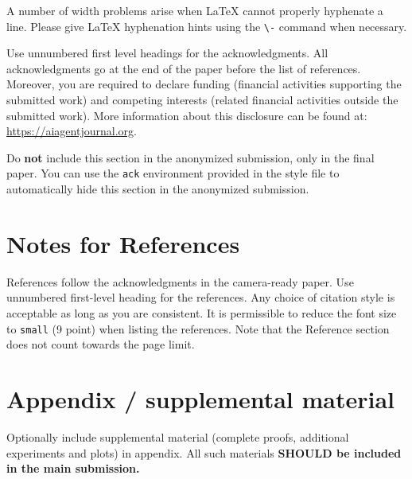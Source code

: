 \documentclass{article}
\begin{document}
A number of width problems arise when \LaTeX{} cannot properly hyphenate a
line. Please give LaTeX hyphenation hints using the \verb+\-+ command when
necessary.

\begin{ack}
Use unnumbered first level headings for the acknowledgments. All acknowledgments
go at the end of the paper before the list of references. Moreover, you are required to declare
funding (financial activities supporting the submitted work) and competing interests (related financial activities outside the submitted work).
More information about this disclosure can be found at: \url{https://aiagentjournal.org}.


Do {\bf not} include this section in the anonymized submission, only in the final paper. You can use the \texttt{ack} environment provided in the style file to automatically hide this section in the anonymized submission.
\end{ack}

\section*{Notes for References}


References follow the acknowledgments in the camera-ready paper. Use unnumbered first-level heading for
the references. Any choice of citation style is acceptable as long as you are
consistent. It is permissible to reduce the font size to \verb+small+ (9 point)
when listing the references.
Note that the Reference section does not count towards the page limit.
\medskip






\appendix

\section{Appendix / supplemental material}


Optionally include supplemental material (complete proofs, additional experiments and plots) in appendix.
All such materials \textbf{SHOULD be included in the main submission.}

\end{document}
